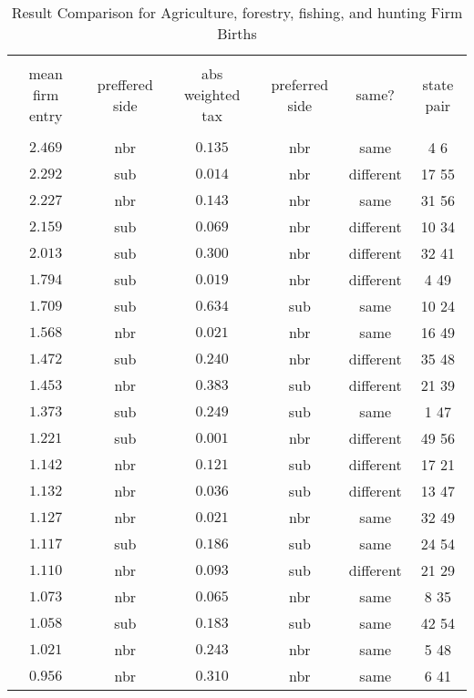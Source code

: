 
\begin{table}[!htbp] \centering 
  \caption{Result Comparison for Agriculture, forestry, fishing, and hunting Firm Births} 
  \label{} 
\small 
\begin{tabular}{@{\extracolsep{5pt}} cccccc} 
\\[-1.8ex]\hline 
\hline \\[-1.8ex] 
mean firm entry & preffered side & abs weighted tax & preferred side & same? & state pair \\ 
\hline \\[-1.8ex] 
$2.469$ & nbr & $0.135$ & nbr & same & 4 6  \\ 
$2.292$ & sub & $0.014$ & nbr & different & 17 55  \\ 
$2.227$ & nbr & $0.143$ & nbr & same & 31 56  \\ 
$2.159$ & sub & $0.069$ & nbr & different & 10 34  \\ 
$2.013$ & sub & $0.300$ & nbr & different & 32 41  \\ 
$1.794$ & sub & $0.019$ & nbr & different & 4 49  \\ 
$1.709$ & sub & $0.634$ & sub & same & 10 24  \\ 
$1.568$ & nbr & $0.021$ & nbr & same & 16 49  \\ 
$1.472$ & sub & $0.240$ & nbr & different & 35 48  \\ 
$1.453$ & nbr & $0.383$ & sub & different & 21 39  \\ 
$1.373$ & sub & $0.249$ & sub & same & 1 47  \\ 
$1.221$ & sub & $0.001$ & nbr & different & 49 56  \\ 
$1.142$ & nbr & $0.121$ & sub & different & 17 21  \\ 
$1.132$ & nbr & $0.036$ & sub & different & 13 47  \\ 
$1.127$ & nbr & $0.021$ & nbr & same & 32 49  \\ 
$1.117$ & sub & $0.186$ & sub & same & 24 54  \\ 
$1.110$ & nbr & $0.093$ & sub & different & 21 29  \\ 
$1.073$ & nbr & $0.065$ & nbr & same & 8 35  \\ 
$1.058$ & sub & $0.183$ & sub & same & 42 54  \\ 
$1.021$ & nbr & $0.243$ & nbr & same & 5 48  \\ 
$0.956$ & nbr & $0.310$ & nbr & same & 6 41  \\ 

\end{tabular}
\end{table}
